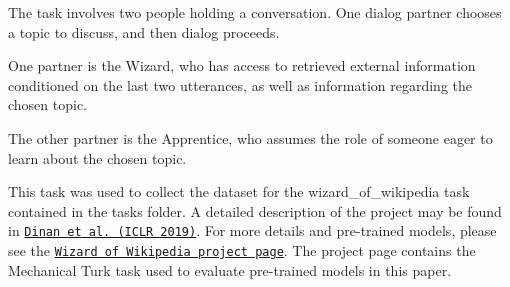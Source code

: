 The task involves two people holding a conversation. One dialog partner chooses a topic to discuss, and then dialog proceeds.

One partner is the Wizard, who has access to retrieved external information conditioned on the last two utterances, as well as information regarding the chosen topic.

The other partner is the Apprentice, who assumes the role of someone eager to learn about the chosen topic.

This task was used to collect the dataset for the wizard\+\_\+of\+\_\+wikipedia task contained in the tasks folder. A detailed description of the project may be found in \href{https://arxiv.org/abs/1811.01241}{\tt Dinan et al. (I\+C\+LR 2019)}. For more details and pre-\/trained models, please see the \href{https://github.com/facebookresearch/ParlAI/tree/master/projects/wizard_of_wikipedia}{\tt Wizard of Wikipedia project page}. The project page contains the Mechanical Turk task used to evaluate pre-\/trained models in this paper. 